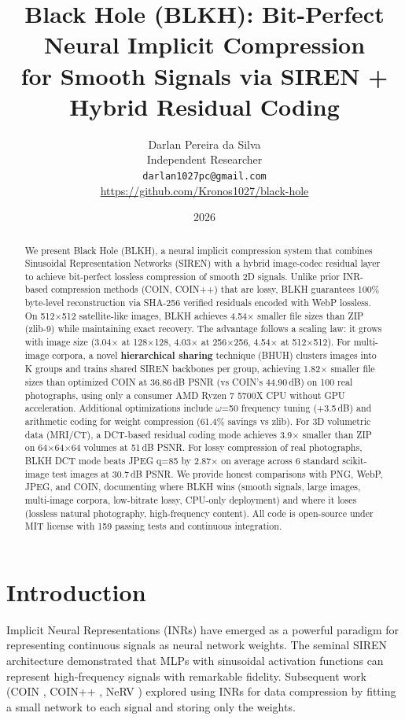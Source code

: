 \documentclass[11pt,a4paper]{article}
\title{\textbf{Black Hole (BLKH): Bit-Perfect Neural Implicit Compression\\
for Smooth Signals via SIREN + Hybrid Residual Coding}}
\author{
    Darlan Pereira da Silva\\
    Independent Researcher\\
    \texttt{darlan1027pc@gmail.com}\\
    \url{https://github.com/Kronos1027/black-hole}
}
\date{2026}
\begin{document}
\maketitle

\begin{abstract}
We present Black Hole (BLKH), a neural implicit compression system that combines Sinusoidal Representation Networks (SIREN) with a hybrid image-codec residual layer to achieve bit-perfect lossless compression of smooth 2D signals. Unlike prior INR-based compression methods (COIN, COIN++) that are lossy, BLKH guarantees 100\% byte-level reconstruction via SHA-256 verified residuals encoded with WebP lossless. On 512$\times$512 satellite-like images, BLKH achieves 4.54$\times$ smaller file sizes than ZIP (zlib-9) while maintaining exact recovery. The advantage follows a scaling law: it grows with image size (3.04$\times$ at 128$\times$128, 4.03$\times$ at 256$\times$256, 4.54$\times$ at 512$\times$512). For multi-image corpora, a novel \textbf{hierarchical sharing} technique (BHUH) clusters images into K groups and trains shared SIREN backbones per group, achieving 1.82$\times$ smaller file sizes than optimized COIN at 36.86$\,$dB PSNR (vs COIN's 44.90$\,$dB) on 100 real photographs, using only a consumer AMD Ryzen 7 5700X CPU without GPU acceleration. Additional optimizations include $\omega$=50 frequency tuning (+3.5$\,$dB) and arithmetic coding for weight compression (61.4\% savings vs zlib). For 3D volumetric data (MRI/CT), a DCT-based residual coding mode achieves 3.9$\times$ smaller than ZIP on 64$\times$64$\times$64 volumes at 51\,dB PSNR. For lossy compression of real photographs, BLKH DCT mode beats JPEG q=85 by 2.87$\times$ on average across 6 standard scikit-image test images at 30.7\,dB PSNR. We provide honest comparisons with PNG, WebP, JPEG, and COIN, documenting where BLKH wins (smooth signals, large images, multi-image corpora, low-bitrate lossy, CPU-only deployment) and where it loses (lossless natural photography, high-frequency content). All code is open-source under MIT license with 159 passing tests and continuous integration.
\end{abstract}

\section{Introduction}

Implicit Neural Representations (INRs) have emerged as a powerful paradigm for representing continuous signals as neural network weights. The seminal SIREN architecture \cite{sitzmann2020siren} demonstrated that MLPs with sinusoidal activation functions can represent high-frequency signals with remarkable fidelity. Subsequent work (COIN \cite{dupont2021coin}, COIN++ \cite{dupont2022coin++}, NeRV \cite{chen2021nerv}) explored using INRs for data compression by fitting a small network to each signal and storing only the weights.
\end{document}
